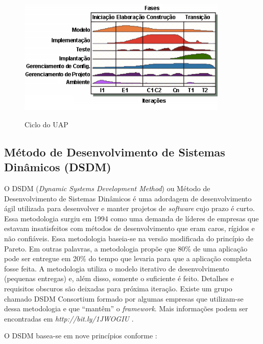 \begin{figure}[htb!]
\begin{center}
\caption{Ciclo do UAP}
\label{fig:uap}
\includegraphics[width=10cm]{assets/uap} \\
\end{center}
\end{figure}

\subsection{Método de Desenvolvimento de Sistemas Dinâmicos (DSDM)}

O DSDM (\textit{Dynamic Systems Development Method}) ou Método de Desenvolvimento de Sistemas Dinâmicos é uma adordagem de desenvolvimento ágil utilizada para desenvolver e manter projetos de \textit{software} cujo prazo é curto. Essa metodologia surgiu em 1994 como uma demanda de líderes de empresas que estavam insatisfeitos com métodos de desenvolvimento que eram caros, rígidos e não confiáveis. Essa metodologia baseia-se na versão modificada do princípio de Pareto. Em outras palavras, a metodologia propõe que 80\% de uma aplicação pode ser entregue em 20\% do tempo que levaria para que a aplicação completa fosse feita. A metodologia utiliza o modelo iterativo de desenvolvimento (pequenas entregas) e, além disso, somente o suficiente é feito. Detalhes e requisitos obscuros são deixadas para próxima iteração. Existe um grupo chamado DSDM Consortium formado por algumas empresas que utilizam-se dessa metodologia e que ``mantêm'' o \textit{framework}. Mais informações podem ser encontradas em \textit{http://bit.ly/1JWOGIU} \cite{pressman:11} \cite{dsdm:2015}. 

O DSDM basea-se em nove princípios conforme :

